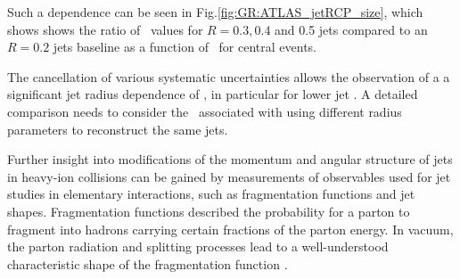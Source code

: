 Such a dependence can be seen in Fig.\ref{fig:GR:ATLAS_jetRCP_size}, which shows 
shows the ratio of \Rcp\ values for $R = 0.3, 0.4$ and 0.5 jets compared
to an $R = 0.2$ jets baseline as a function of \pt\ for central events.

The cancellation of various systematic uncertainties allows the observation of a 
a significant jet radius dependence of \Rcp, in particular for
lower jet \pt. A detailed comparison needs to consider the \pt\ associated with
using different radius parameters to reconstruct the same jets.

Further insight into modifications of the momentum and angular structure
of jets in heavy-ion collisions can be gained by measurements of 
observables used for jet studies in elementary interactions, such as 
fragmentation functions and jet shapes.
Fragmentation functions described the probability for a parton to fragment into
hadrons carrying certain fractions of the parton energy. 
In vacuum, the parton radiation and splitting processes lead to a
well-understood characteristic shape of the fragmentation function \cite{Dokshitzer:1991wu}.

